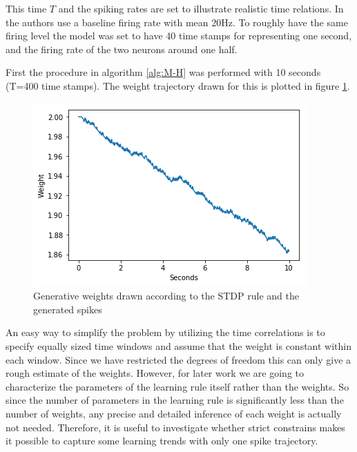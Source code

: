 This time $T$ and the spiking rates are set to illustrate realistic time relations. In \cite{Linderman} the authors use a baseline firing rate with mean 20Hz. To roughly have the same firing level the model was set to have 40 time stamps for representing one second, and the firing rate of the two neurons around one half. 

First the procedure in algorithm \ref{alg:M-H} was performed with 10 seconds (T=400 time stamps). The weight trajectory drawn for this is plotted in figure \ref{fig:w_STDP}. 


\begin{figure}[hbt!]
\caption{Generative weights drawn according to the STDP rule and the generated spikes}
\label{fig:w_STDP}
    \centering
    \includegraphics[scale=0.8]{fig/LR_underllying.png}
\end{figure}

An easy way to simplify the problem by utilizing the time correlations is to specify equally sized time windows and assume that the weight is constant within each window. Since we have restricted the degrees of freedom this can only give a rough estimate of the weights. However, for later work we are going to characterize the parameters of the learning rule itself rather than the weights. So since the number of parameters in the learning rule is significantly less than the number of weights, any precise and detailed inference of each weight is actually not needed. Therefore, it is useful to investigate whether strict constrains makes it possible to capture some learning trends with only one spike trajectory.




